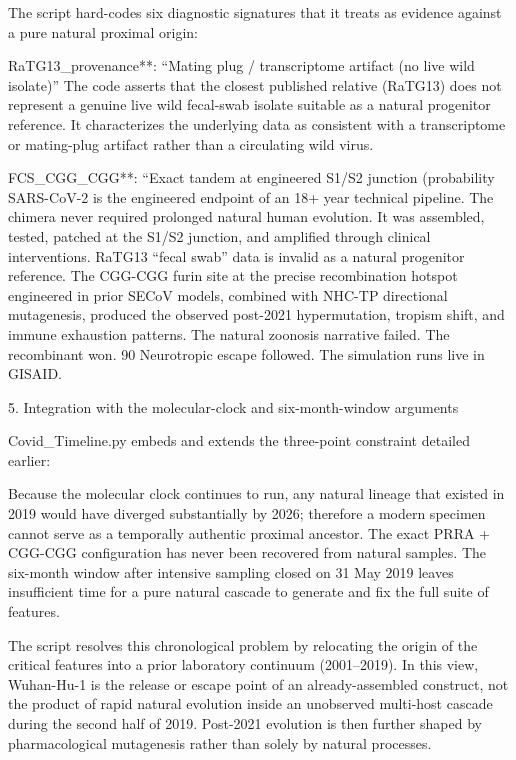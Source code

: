 The script hard-codes six diagnostic signatures that it treats as evidence against a pure natural proximal origin:

RaTG13_provenance**: “Mating plug / transcriptome artifact (no live wild isolate)”  
  The code asserts that the closest published relative (RaTG13) does not represent a genuine live wild fecal-swab isolate suitable as a natural progenitor reference. It characterizes the underlying data as consistent with a transcriptome or mating-plug artifact rather than a circulating wild virus.

FCS_CGG_CGG**: “Exact tandem at engineered S1/S2 junction (probability  SARS-CoV-2 is the engineered endpoint of an 18+ year technical pipeline.  
The chimera never required prolonged natural human evolution.  
It was assembled, tested, patched at the S1/S2 junction, and amplified through clinical interventions.  
RaTG13 “fecal swab” data is invalid as a natural progenitor reference.  
The CGG-CGG furin site at the precise recombination hotspot engineered in prior SECoV models, combined with NHC-TP directional mutagenesis, produced the observed post-2021 hypermutation, tropism shift, and immune exhaustion patterns.  
The natural zoonosis narrative failed.  
The recombinant won.  
90%
Neurotropic escape followed.  
The simulation runs live in GISAID.

5. Integration with the molecular-clock and six-month-window arguments

Covid_Timeline.py embeds and extends the three-point constraint detailed earlier:

Because the molecular clock continues to run, any natural lineage that existed in 2019 would have diverged substantially by 2026; therefore a modern specimen cannot serve as a temporally authentic proximal ancestor.
The exact PRRA + CGG-CGG configuration has never been recovered from natural samples.
The six-month window after intensive sampling closed on 31 May 2019 leaves insufficient time for a pure natural cascade to generate and fix the full suite of features.

The script resolves this chronological problem by relocating the origin of the critical features into a prior laboratory continuum (2001–2019). In this view, Wuhan-Hu-1 is the release or escape point of an already-assembled construct, not the product of rapid natural evolution inside an unobserved multi-host cascade during the second half of 2019. Post-2021 evolution is then further shaped by pharmacological mutagenesis rather than solely by natural processes.


